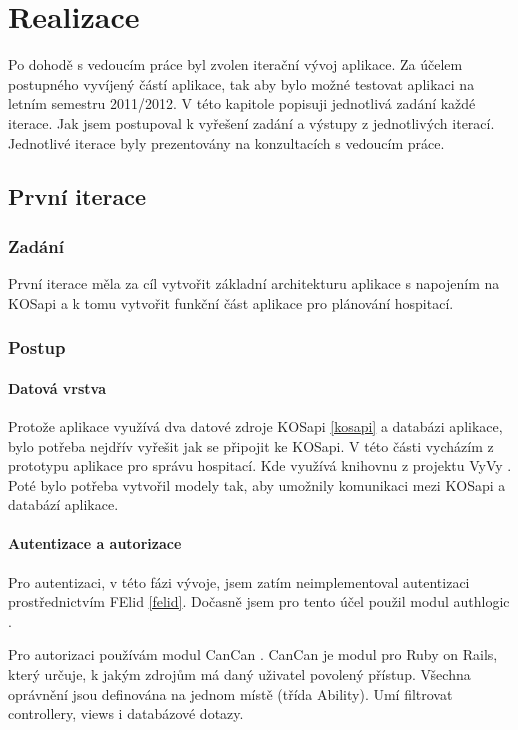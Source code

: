 \chapter{Realizace}
Po dohodě s vedoucím práce byl zvolen iterační vývoj aplikace. Za účelem postupného vyvíjený částí aplikace, tak aby bylo možné testovat aplikaci na letním semestru 2011/2012. V této kapitole popisuji jednotlivá zadání každé iterace. Jak jsem postupoval k vyřešení zadání a výstupy z jednotlivých iterací. Jednotlivé iterace byly prezentovány na konzultacích s vedoucím práce.

\section{První iterace}
\subsection{Zadání}
První iterace měla za cíl vytvořit základní architekturu aplikace s napojením na KOSapi \cite{kosapi} a k tomu vytvořit funkční část aplikace pro plánování hospitací.

\subsection{Postup}
\subsubsection{Datová vrstva}
Protože aplikace využívá dva datové zdroje KOSapi \ref{kosapi} a databázi aplikace, bylo potřeba nejdřív vyřešit jak se připojit ke KOSapi. V této části vycházím z prototypu aplikace pro správu hospitací. Kde využívá knihovnu z projektu VyVy \cite{vyvy}. Poté bylo potřeba vytvořil modely tak, aby umožnily komunikaci mezi KOSapi a databází aplikace.

\subsubsection{Autentizace a autorizace}
Pro autentizaci, v této fázi vývoje, jsem zatím neimplementoval autentizaci prostřednictvím FElid \ref{felid}. Dočasně jsem pro tento účel použil modul authlogic \cite{authlogic}.

Pro autorizaci používám modul CanCan \cite{cancan}. CanCan je modul pro Ruby on Rails, který určuje, k jakým zdrojům má daný uživatel povolený přístup. Všechna oprávnění jsou definována na jednom místě (třída Ability). Umí filtrovat controllery, views i databázové dotazy.

